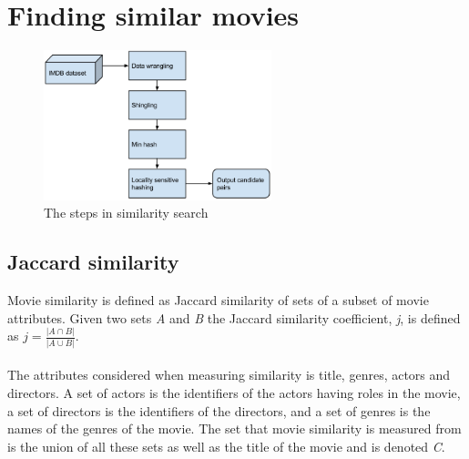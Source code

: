 \section{Finding similar movies}
	\begin{figure}[H]
	\centering
	\includegraphics[width=250px]{img/Similaritysearchdiagram.png}
	\caption{The steps in similarity search} 
	\label{fig:p_graph}
\end{figure}
\subsection{Jaccard similarity}
Movie similarity is defined as Jaccard similarity of sets of a subset of movie attributes. Given two sets \textit{A} and \textit{B} the Jaccard similarity coefficient, \textit{j}, is defined as \(j = \frac{|A \cap B|}{|A \cup B|}\). \\ \\
The attributes considered when measuring similarity is title, genres, actors and directors. A set of actors is the identifiers of the actors having roles in the movie, a set of directors is the identifiers of the directors, and a set of genres is the names of the genres of the movie. The set that movie similarity is measured from is the union of all these sets as well as the title of the movie and is denoted \textit{C}.

